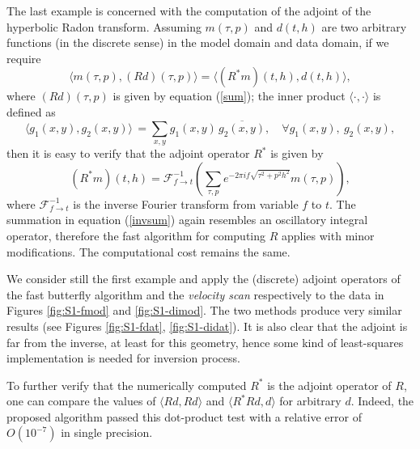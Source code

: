 The last example is concerned with the computation of the adjoint of the hyperbolic Radon transform. Assuming $m(\tau,p)$ and $d(t,h)$ are two arbitrary functions (in the discrete sense) in the model domain and data domain, if we require 
\begin{equation}
\langle m(\tau,p),(Rd)(\tau,p)\rangle =\langle(R^*m)(t,h),d(t,h)\rangle,
\end{equation}
where $(Rd)(\tau,p)$ is given by equation (\ref{sum}); the inner product $\langle\cdot,\cdot\rangle$ is defined as
\begin{equation}
\langle g_1(x,y),g_2(x,y)\rangle\,=\sum_{x,y} g_1(x,y)\,\overline{g_2
(x,y)}, \quad \forall g_1(x,y), \ g_2(x,y),
\end{equation}
then it is easy to verify that the adjoint operator $R^*$ is given by
\begin{equation} \label{invsum}
(R^*m)(t,h)=\mathcal{F}_{f\rightarrow t}^{-1}\left(\sum_{\tau,p}e^{-2\pi i f \sqrt{\tau^2+p^2h^2}}m(\tau,p)\right),
\end{equation}
where $\mathcal{F}^{-1}_{f\rightarrow t}$ is the inverse Fourier transform from variable $f$ to $t$. The summation in equation (\ref{invsum}) again resembles an oscillatory integral operator, therefore the fast algorithm for computing $R$ applies with minor modifications. The computational cost remains the same.

We consider still the first example and apply the (discrete) adjoint operators of the fast butterfly algorithm and the {\it velocity scan} respectively to the data in Figures \ref{fig:S1-fmod} and \ref{fig:S1-dimod}. The two methods produce very similar results (see Figures \ref{fig:S1-fdat}, \ref{fig:S1-didat}). It is also clear that the adjoint is far from the inverse, at least for this geometry, hence some kind of least-squares implementation is needed for inversion process.

To further verify that the numerically computed $R^*$ is the adjoint operator of $R$, one can compare the values of $\langle Rd,Rd\rangle$ and $\langle R^*Rd,d\rangle$ for arbitrary $d$. Indeed, the proposed algorithm passed this dot-product test with a relative error of $O(10^{-7})$ in single precision.



